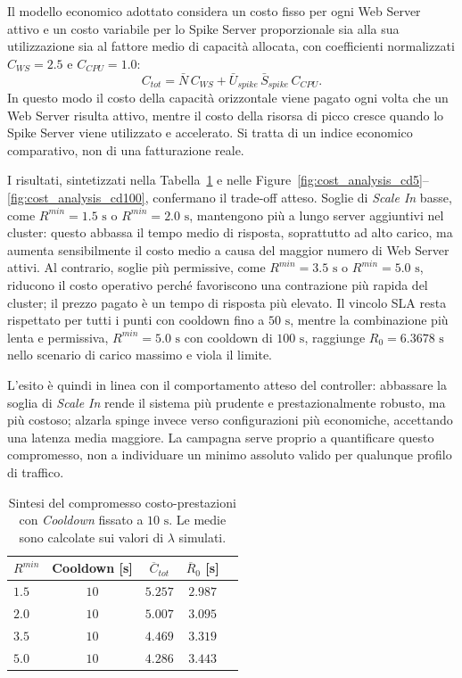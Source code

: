 ﻿\documentclass[a4paper,12pt]{article}
\begin{document}
Il modello economico adottato considera un costo fisso per ogni Web Server attivo e un costo variabile per lo Spike Server proporzionale sia alla sua utilizzazione sia al fattore medio di capacità allocata, con coefficienti normalizzati $C_{WS}=2.5$ e $C_{CPU}=1.0$:
\[
    C_{tot} = \bar{N}\,C_{WS} + \bar{U}_{spike}\,\bar{S}_{spike}\,C_{CPU}.
\]
In questo modo il costo della capacità orizzontale viene pagato ogni volta che un Web Server risulta attivo, mentre il costo della risorsa di picco cresce quando lo Spike Server viene utilizzato e accelerato. Si tratta di un indice economico comparativo, non di una fatturazione reale.

I risultati, sintetizzati nella Tabella~\ref{tab:cost_tradeoff_results} e nelle Figure~\ref{fig:cost_analysis_cd5}--\ref{fig:cost_analysis_cd100}, confermano il trade-off atteso. Soglie di \textit{Scale In} basse, come $R^{min}=1.5\text{ s}$ o $R^{min}=2.0\text{ s}$, mantengono più a lungo server aggiuntivi nel cluster: questo abbassa il tempo medio di risposta, soprattutto ad alto carico, ma aumenta sensibilmente il costo medio a causa del maggior numero di Web Server attivi. Al contrario, soglie più permissive, come $R^{min}=3.5\text{ s}$ o $R^{min}=5.0\text{ s}$, riducono il costo operativo perché favoriscono una contrazione più rapida del cluster; il prezzo pagato è un tempo di risposta più elevato. Il vincolo SLA resta rispettato per tutti i punti con cooldown fino a $50\text{ s}$, mentre la combinazione più lenta e permissiva, $R^{min}=5.0\text{ s}$ con cooldown di $100\text{ s}$, raggiunge $R_0=6.3678\text{ s}$ nello scenario di carico massimo e viola il limite.

L'esito è quindi in linea con il comportamento atteso del controller: abbassare la soglia di \textit{Scale In} rende il sistema più prudente e prestazionalmente robusto, ma più costoso; alzarla spinge invece verso configurazioni più economiche, accettando una latenza media maggiore. La campagna serve proprio a quantificare questo compromesso, non a individuare un minimo assoluto valido per qualunque profilo di traffico.

\begin{table}[H]
    \centering
    \small
    \renewcommand{\arraystretch}{1.25}
    \begin{tabular}{lcccc}
        \hline
        \textbf{$R^{min}$} & \textbf{Cooldown [s]} & \textbf{$\overline{C}_{tot}$} & \textbf{$\overline{R}_0$ [s]} \\ \hline
        $1.5$ & $10$ & $5.257$ & $2.987$ \\
        $2.0$ & $10$ & $5.007$ & $3.095$ \\
        $3.5$ & $10$ & $4.469$ & $3.319$ \\
        $5.0$ & $10$ & $4.286$ & $3.443$ \\ \hline
    \end{tabular}
    \caption{Sintesi del compromesso costo-prestazioni con \textit{Cooldown} fissato a $10\text{ s}$. Le medie sono calcolate sui valori di $\lambda$ simulati.}
    \label{tab:cost_tradeoff_results}
\end{table}
\end{document}
